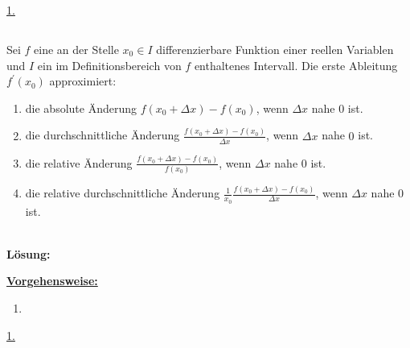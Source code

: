 \underline{1. }\\




\newpage

\subsection*{}
Sei $f$ eine an der Stelle $x_0 \in I $ differenzierbare Funktion einer reellen Variablen und $I$ ein im Definitionsbereich von $f$ enthaltenes Intervall. Die erste Ableitung $f^\prime(x_0)$ approximiert: 
\renewcommand{\labelenumi}{(\alph{enumi})}
\begin{enumerate}
	\item 
	die absolute Änderung $f(x_0 + \Delta x) - f(x_0)$, wenn $\Delta x$ nahe $0$ ist.
	\item
	die durchschnittliche Änderung $\frac{f(x_0 + \Delta x) - f(x_0)}{\Delta x}$, wenn $\Delta x$ nahe $0$ ist.
	\item
	die relative Änderung $\frac{f(x_0 + \Delta x) - f(x_0)}{f(x_0)}$, wenn $\Delta x$ nahe $0$ ist.
	\item
	die relative durchschnittliche Änderung $\frac{1}{x_0} \frac{f(x_0 + \Delta x) - f(x_0)}{\Delta x}$, wenn $\Delta x$ nahe $0$ ist.
\end{enumerate}
\ \\
\textbf{Lösung:}
\begin{mdframed}
\underline{\textbf{Vorgehensweise:}}
\renewcommand{\labelenumi}{\theenumi.}
\begin{enumerate}
\item 
\end{enumerate}
\end{mdframed}

\underline{1. }\\



\newpage
